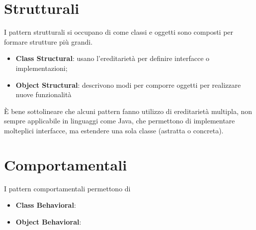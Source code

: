 \section{Strutturali}

I pattern strutturali si occupano di come classi e oggetti sono composti per formare strutture più grandi. 
\begin{itemize}
    \item \textbf{Class Structural}: usano l'ereditarietà per definire interfacce o implementazioni;
    \item \textbf{Object Structural}: descrivono modi per comporre oggetti per realizzare nuove funzionalità
\end{itemize}

È bene sottolineare che alcuni pattern fanno utilizzo di ereditarietà multipla, non sempre applicabile in linguaggi come Java, che permettono di implementare molteplici interfacce, ma estendere una sola classe (astratta o concreta).









\section{Comportamentali}

I pattern comportamentali permettono di 
\begin{itemize}
    \item \textbf{Class Behavioral}:
    \item \textbf{Object Behavioral}:
\end{itemize}











